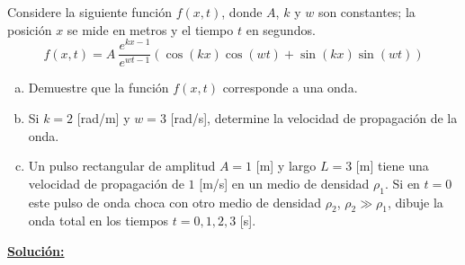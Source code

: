 \item
	Considere la siguiente función $f(x,t)$, donde $A$, $k$ y $w$ son constantes; la posición $x$ se mide en metros y el tiempo $t$ en segundos.
	\begin{equation*}
	f(x,t) = A \ \dfrac{e^{kx-1}}{e^{wt-1}} \left( \cos(kx) \cos(wt) + \sin(kx) \sin(wt) \right)
	\end{equation*}
	
\begin{enumerate}[a)]
	\item Demuestre que la función $f(x,t)$ corresponde a una onda.
	
	\item Si $k=2$ [rad/m] y $w=3$ [rad/s], determine la velocidad de propagación de la onda.

	\item Un pulso rectangular de amplitud $A=1$ [m] y largo $L=3$ [m] tiene una velocidad de propagación de $1$ [m/s] en un medio de densidad $\rho_1$. Si en $t=0$ este pulso de onda choca con otro medio de densidad $\rho_2$, $\rho_2 \gg \rho_1$, dibuje la onda total en los tiempos $t=0, 1, 2, 3$ [s].
\end{enumerate}

\textbf{\underline{Solución:}}


